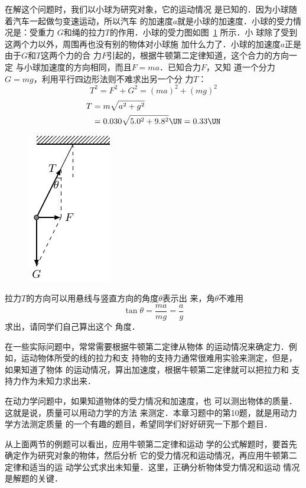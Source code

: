 \begin{solution}
    在解这个问题时，我们以小球为研究对象，它的运动情况
是已知的．因为小球随着汽车一起做匀变速运动，所以汽车
的加速度$a$就是小球的加速度．小球的受力情况是：受重力
$G$和绳的拉力$T$的作用．小球的受力图如图~\ref{fig_A_3-11} 所示．小
球除了受到这两个力以外，周围再也没有别的物体对小球施
加什么力了．小球的加速度$a$正是由于$G$和$T$这两个力的合
力$F$引起的，根据牛顿第二定律知道，这个合力的方向一定
与小球加速度的方向相同，而且$F=ma$．已知合力$F$，又知
道一个分力$G=mg$，利用平行四边形法则不难求出另一个分
力$T$：
\[T^2=F^2+G^2=(ma)^2+(mg)^2 \]
\[\begin{split}
T&=m\sqrt{a^2+g^2}\\
&=0.030\sqrt{5.0^2+9.8^2} \UN=0.33 \UN
\end{split} \]
\end{solution}

\begin{figure}[htp]
    \centering
    \includegraphics{fig/A/3-11.pdf}
    \caption{}\label{fig_A_3-11}
\end{figure}

    拉力$T$的方向可以用悬线与竖直方向的角度$\theta$表示出
来，角$\theta$不难用\[\tan\theta =\frac{ma}{mg}=\frac{a}{g} \]
求出，请同学们自己算出这个
角度．

    在一些实际问题中，常常需要根据牛顿第二定律从物体
的运动情况来确定力．例如，运动物体所受的线的拉力和支
持物的支持力通常很难用实验来测定，但是，如果知道了物体
的运动情况，算出加速度，根据牛顿第二定律就可以把拉力和
支持力作为未知力求出来．

    在动力学问题中，如果知道物体的受力情况和加速度，也
可以测出物体的质量．这就是说，质量可以用动力学的方法
来测定．本章习题中的第10题，就是用动力学方法测定质量
的一个有趣的题目，希望同学们好好研究一下那个题目．

    从上面两节的例题可以看出，应用牛顿第二定律和运动
学的公式解题时，要首先确定作为研究对象的物体，然后分析
它的受力情况和运动情况，再应用牛顿第二定律和适当的运
动学公式求出未知量．这里，正确分析物体受力情况和运动
情况是解题的关键．

